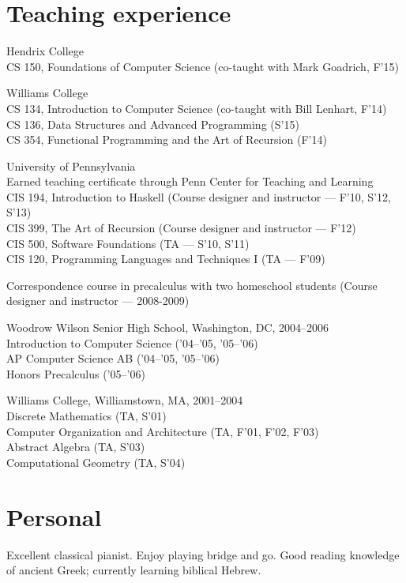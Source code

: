 \documentclass[12pt]{article}
\newcommand{\cvitem}{\par\hangpara{2em}{1}}
\begin{document}
\section*{Teaching experience}

\cvitem
Hendrix College \\
CS 150, Foundations of Computer Science (co-taught with Mark Goadrich, F'15)

\cvitem
Williams College \\
CS 134, Introduction to Computer Science (co-taught with Bill Lenhart,
F'14) \\
CS 136, Data Structures and Advanced Programming (S'15) \\
CS 354, Functional Programming and the Art of Recursion (F'14)

\cvitem
University of Pennsylvania \\
Earned teaching certificate through Penn Center for Teaching and
Learning \\
CIS 194, Introduction to Haskell (Course designer and instructor ---
F'10, S'12, S'13) \\
CIS 399, The Art of Recursion (Course designer and instructor ---
F'12) \\
CIS 500, Software Foundations (TA --- S'10, S'11) \\
CIS 120, Programming Languages and Techniques I (TA --- F'09)

\cvitem
Correspondence course in precalculus with two homeschool students
(Course designer and instructor --- 2008-2009)

\cvitem
Woodrow Wilson Senior High School, Washington, DC, 2004--2006 \\
Introduction to Computer Science ('04--'05, '05--'06) \\
AP Computer Science AB ('04--'05, '05--'06) \\
Honors Precalculus ('05--'06)

\cvitem
Williams College, Williamstown, MA, 2001--2004 \\
Discrete Mathematics (TA, S'01) \\
Computer Organization and Architecture (TA, F'01, F'02, F'03) \\
Abstract Algebra (TA, S'03) \\
Computational Geometry (TA, S'04) \\

\section*{Personal}

Excellent classical pianist.  Enjoy playing bridge and go.  Good
reading knowledge of ancient Greek; currently learning biblical
Hebrew.
\end{document}
